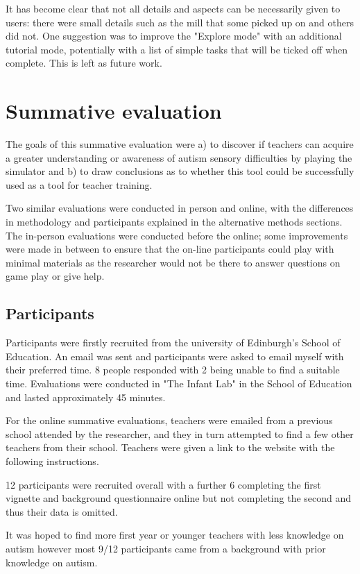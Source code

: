 \documentclass[11pt]{report}
\begin{document}
It has become clear that not all details and aspects can be necessarily given to users: there were small details such as the mill that some picked up on and others did not. One suggestion was to improve the "Explore mode" with an additional tutorial mode, potentially with a list of simple tasks that will be ticked off when complete. This is left as future work.


\chapter{Summative evaluation}
The goals of this summative evaluation were a) to discover if teachers can acquire a greater understanding or awareness of autism sensory difficulties by playing the simulator and b) to draw conclusions as to whether this tool could be successfully used as a tool for teacher training. 

Two similar evaluations were conducted in person and online, with the differences in methodology and participants explained in the alternative methods sections. The in-person evaluations were conducted before the online; some improvements were made in between to ensure that the on-line participants could play with minimal materials as the researcher would not be there to answer questions on game play or give help. 

\section{Participants}
Participants were firstly recruited from the university of Edinburgh's School of Education. An email was sent and participants were asked to email myself with their preferred time. 8 people responded with 2 being unable to find a suitable time. Evaluations were conducted in "The Infant Lab" in the School of Education and lasted approximately 45 minutes.

For the online summative evaluations, teachers were emailed from a previous school attended by the researcher, and they in turn attempted to find a few other teachers from their school. Teachers were given a link to the website with the following instructions.

12 participants were recruited overall with a further 6 completing the first vignette and background questionnaire online but not completing the second and thus their data is omitted. 

It was hoped to find more first year or younger teachers with less knowledge on autism however most 9/12 participants came from a background with prior knowledge on autism. 
\end{document}

